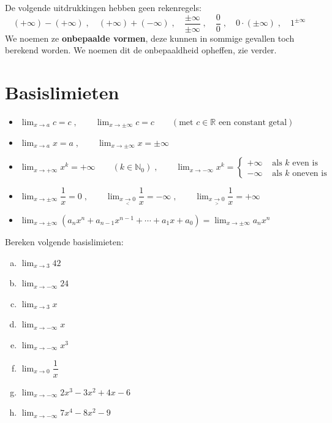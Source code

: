 \documentclass[12pt]{article}
\begin{document}
\begin{theorie}
De volgende uitdrukkingen hebben geen rekenregels:
$$(+\infty)-(+\infty)\;,\quad(+\infty)+(-\infty)\;,\quad\dfrac{\pm\infty}{\pm\infty}\;,\quad\dfrac{0}{0}\;,\quad 0\cdot(\pm\infty)\;,\quad 1^{\pm\infty}$$
We noemen ze {\bf onbepaalde vormen}, deze kunnen in sommige gevallen toch berekend worden. We noemen dit de onbepaaldheid opheffen, zie verder.

\pagebreak

\end{theorie}

\section{Basislimieten}

\begin{theorie}

\begin{itemize}
\item $\displaystyle\lim_{x\to a}c=c\;,\qquad\lim_{x\to \pm\infty}c=c\qquad (\mbox{met } c\in\mathbb{R}\mbox{ een constant getal})$
\item $\displaystyle\lim_{x\to a}x=a\;,\qquad\lim_{x\to \pm\infty}x=\pm\infty$
\item $\displaystyle\lim_{x\to+\infty}x^k = +\infty\qquad(k\in\mathbb{N}_0)\;,\qquad \displaystyle\lim_{x\to-\infty}x^k = \begin{cases}+\infty &\mbox{ als $k$ even is}\\-\infty &\mbox{ als $k$ oneven is} \end{cases}$
\item $\displaystyle\lim_{x\to\pm\infty}\dfrac{1}{x}=0\;,\qquad\lim_{x\underset{<}{\to}0}\dfrac{1}{x}=-\infty\;,\qquad \displaystyle\lim_{x\underset{>}{\to}0}\dfrac{1}{x}=+\infty$
\item $\displaystyle\lim_{x\to\pm\infty}\left(a_nx^n+a_{n-1}x^{n-1}+\cdots+a_1x+a_0\right) = \lim_{x\to\pm\infty}a_nx^n$
\end{itemize}

\end{theorie}

\begin{oefening}
  Bereken volgende basislimieten:
  \begin{enumerate}[(a)]
  \itemsep.5em
  \item $\displaystyle \lim_{x\to 3}42$
  \item $\displaystyle \lim_{x\to -\infty}24$
  \item $\displaystyle \lim_{x\to 3}x$
  \item $\displaystyle \lim_{x\to -\infty}x$
  \item $\displaystyle \lim_{x\to -\infty}x^3$
  \item $\displaystyle \lim_{x\to 0}\dfrac{1}{x}$
  \item $\displaystyle \lim_{x\to -\infty}2x^3-3x^2+4x-6$
  \item $\displaystyle \lim_{x\to -\infty}7x^4-8x^2-9$
  \end{enumerate}
\end{oefening}
\end{document}
